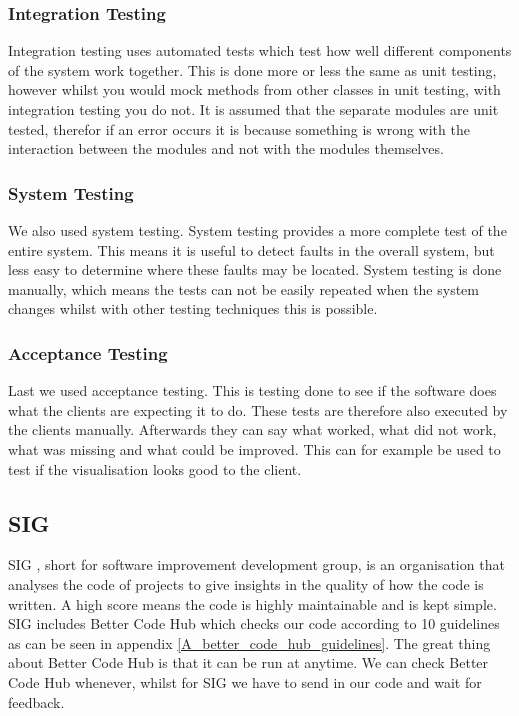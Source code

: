 \subsubsection{Integration Testing}
Integration testing uses automated tests which test how well different components of the system work together. This is done more or less the same as unit testing, however whilst you would mock methods from other classes in unit testing, with integration testing you do not. It is assumed that the separate modules are unit tested, therefor if an error occurs it is because something is wrong with the interaction between the modules and not with the modules themselves. 

\subsubsection{System Testing}
We also used system testing. System testing provides a more complete test of the entire system. This means it is useful to detect faults in the overall system, but less easy to determine where these faults may be located. System testing is done manually, which means the tests can not be easily repeated when the system changes whilst with other testing techniques this is possible.

\subsubsection{Acceptance Testing}\label{sec:acceptance-testing}
Last we used acceptance testing. This is testing done to see if the software does what the clients are expecting it to do. These tests are therefore also executed by the clients manually. Afterwards they can say what worked, what did not work, what was missing and what could be improved. This can for example be used to test if the visualisation looks good to the client.\\

\subsection{SIG}
SIG \cite{sig}, short for software improvement development group, is an organisation that analyses the code of projects to give insights in the quality of how the code is written. A high score means the code is highly maintainable and is kept simple. SIG includes Better Code Hub \cite{better_code_hub} which checks our code according to 10 guidelines as can be seen in appendix \ref{A_better_code_hub_guidelines}. The great thing about Better Code Hub is that it can be run at anytime. We can check Better Code Hub whenever, whilst for SIG we have to send in our code and wait for feedback. 

